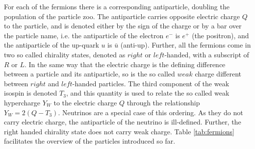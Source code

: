 For each of the fermions there is a corresponding antiparticle, doubling the population of the particle zoo. 
The antiparticle carries opposite electric charge $Q$ to the particle, and is denoted either by the sign of the charge or by a bar over the particle name, i.e. the antiparticle of the electron $e^{-}$ is $e^{+}$ (the positron), and the antiparticle of the up-quark $u$ is $\bar{u}$ (anti-up). 
Further, all the fermions come in two so called chirality states, denoted as $right$ or $left$-handed, with a subscript of $R$ or $L$.
In the same way that the electric charge is the defining difference between a particle and its antiparticle, so is the so called $weak$ charge different between $right$ and $left$-handed particles. 
The third component of the weak isospin is denoted $T_{3}$, and this quantity is used to relate the so called weak hypercharge $Y_{W}$ to the electric charge $Q$ through the relationship $Y_{W}=2(Q-T_{3})$. 
Neutrinos are a special case of this ordering. 
As they do not carry electric charge, the antiparticle of the neutrino is ill-defined. 
Further, the right handed chirality state does not carry weak charge. 
Table \ref{tab:fermions} facilitates the overview of the particles introduced so far.

